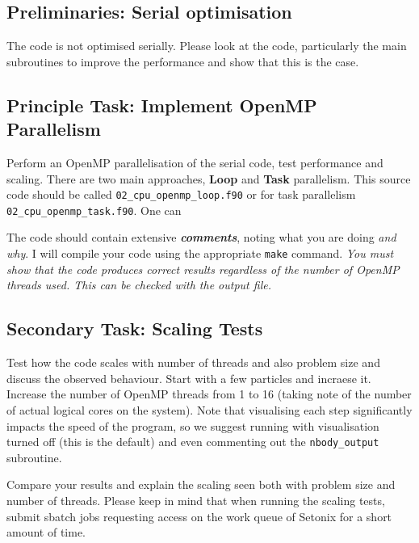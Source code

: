 \documentclass[11pt]{amsart}
\begin{document}
\subsection{{\color{Red} Preliminaries}: Serial optimisation\nopunct\\}\label{sec:tasks:serialopt}
The code is not optimised serially. Please look at the code, particularly the main subroutines to improve the performance and show that this is the case. 

\subsection{{\color{Red} Principle Task}: Implement OpenMP Parallelism\nopunct\\}\label{sec:tasks:omp}
Perform an OpenMP parallelisation of the serial code, test performance and scaling. There are two main approaches, {\color{Orange}\textbf{Loop}} and {\color{Orange}\textbf{Task}} parallelism. This source code should be called \texttt{02\_cpu\_openmp\_loop.f90} or for task parallelism  \texttt{02\_cpu\_openmp\_task.f90}. One can 

The code should contain extensive \textbf{\textit{comments}}, noting what you are doing \textit{and why}. I will compile your code using the appropriate \texttt{make} command.
{\centering \textit{You must show that the code produces correct results regardless of the number of OpenMP threads used. This can be checked with the output file.}}

\subsection{{\color{Red}Secondary Task}: Scaling Tests\nopunct\\}\label{sec:tasks:scaling}
Test how the code scales with number of threads and also problem size and discuss the observed behaviour. Start with a few particles and incraese it. Increase the number of OpenMP threads from 1 to 16 (taking note of the number of actual logical cores on the system). Note that visualising each step significantly impacts the speed of the program, so we suggest running with visualisation turned off (this is the default) and even commenting out the \texttt{nbody\_output} subroutine.

\par 
Compare your results and explain the scaling seen both with problem size and number of threads. Please keep in mind that when running the scaling tests, submit sbatch jobs requesting access on the work queue of Setonix for a short amount of time.
\end{document}
